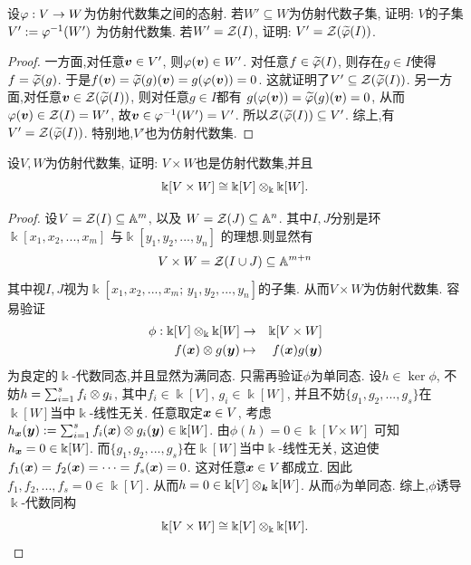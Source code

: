 \documentclass[oneside,a4papar,11pt,UTF8]{book}
\begin{document}
\begin{enumerate}
  \begin{prob}\label{ex-15-1-27}
    设$\varphi:V\to W$为仿射代数集之间的态射.
    若$W'\subseteq W$为仿射代数子集,
    证明: $V$的子集$V':=\varphi^{-1}(W')$
    为仿射代数集.
    若$W'=\mathcal{Z}(I)$,
    证明: $V'=\mathcal{Z}(\widetilde{\varphi}(I))$.
  \end{prob}

  \begin{proof}
    一方面,对任意$\boldsymbol{v}\in V'$,
    则$\varphi(\boldsymbol{v})\in W'$.
    对任意$f\in\widetilde{\varphi}(I)$,
    则存在$g\in I$使得$f=\widetilde{\varphi}(g)$.
    于是$f(\boldsymbol{v})=\widetilde{\varphi}(g)(\boldsymbol{v})=g(\varphi(\boldsymbol{v}))=0$.
    这就证明了$V'\subseteq\mathcal{Z}(\widetilde{\varphi}(I))$.
    另一方面,对任意$\boldsymbol{v}\in\mathcal{Z}(\widetilde{\varphi}(I))$,
    则对任意$g\in I$都有
    $g(\varphi(\boldsymbol{v}))=\widetilde{\varphi}(g)(\boldsymbol{v})=0$,
    从而$\varphi(\boldsymbol{v})\in\mathcal{Z}(I)=W'$,
    故$\boldsymbol{v}\in\varphi^{-1}(W')=V'$.
    所以$\mathcal{Z}(\widetilde{\varphi}(I))\subseteq V'$.
    综上,有$V'=\mathcal{Z}(\widetilde{\varphi}(I))$.
    特别地,$V'$也为仿射代数集.
  \end{proof}

  \begin{prob}\label{ex-15-1-28}
    设$V,W$为仿射代数集,
    证明: $V\times W$也是仿射代数集,并且
    \[\Bbbk[V\times W]\cong\Bbbk[V]\otimes_{\Bbbk}\Bbbk[W].\]
  \end{prob}

  \begin{proof}
    设$V=\mathcal{Z}(I)\subseteq\mathbb{A}^m$, 以及
    $W=\mathcal{Z}(J)\subseteq\mathbb{A}^n$.
    其中$I,J$分别是环$\Bbbk[x_1,x_2,...,x_m]$
    与$\Bbbk[y_1,y_2,...,y_n]$
    的理想.则显然有
    \[V\times W=\mathcal{Z}(I\cup J)\subseteq \mathbb{A}^{m+n}\]
    其中视$I,J$视为$\Bbbk[x_1,x_2,...,x_m;\,y_1,y_2,...,y_n]$的子集.
    从而$V\times W$为仿射代数集.
    容易验证
    \begin{eqnarray*}
      \phi:\Bbbk[V]\otimes_{\Bbbk}\Bbbk[W]&\to&\Bbbk[V\times W]\\
      f(\boldsymbol{x})\otimes g(\boldsymbol{y})&\mapsto& f(\boldsymbol{x})g(\boldsymbol{y})
    \end{eqnarray*}
    为良定的$\Bbbk$-代数同态,并且显然为满同态.
    只需再验证$\phi$为单同态.
    设$h\in\ker\phi$,
    不妨$h=\sum_{i=1}^{s}f_i\otimes g_i$,
    其中$f_i\in\Bbbk[V],\,g_i\in\Bbbk[W]$,
    并且不妨$\{g_1,g_2,...,g_s\}$在$\Bbbk[W]$当中$\Bbbk$-线性无关.
    任意取定$\boldsymbol{x}\in V$,
    考虑$h_{\boldsymbol{x}}(\boldsymbol{y}):=\sum_{i=1}^{s}f_i(\boldsymbol{x})\otimes g_i(\boldsymbol{y})\in\Bbbk[W]$.
    由$\phi(h)=0\in\Bbbk[V\times W]$
    可知$h_{\boldsymbol{x}}=0\in\Bbbk[W]$.
    而$\{g_1,g_2,...,g_s\}$在$\Bbbk[W]$当中$\Bbbk$-线性无关,
    这迫使$f_1(\boldsymbol{x})=f_2(\boldsymbol{x})=\cdots=f_s(\boldsymbol{x})=0$.
    这对任意$\boldsymbol{x}\in V$都成立.
    因此$f_1,f_2,...,f_s=0\in\Bbbk[V]$.
    从而$h=0\in\Bbbk[V]\otimes_{\boldsymbol{k}}\Bbbk[W]$.
    从而$\phi$为单同态.
    综上,$\phi$诱导$\Bbbk$-代数同构
    \[\Bbbk[V\times W]\cong\Bbbk[V]\otimes_{\Bbbk}\Bbbk[W].\]
  \end{proof}
\end{enumerate}
\end{document}
